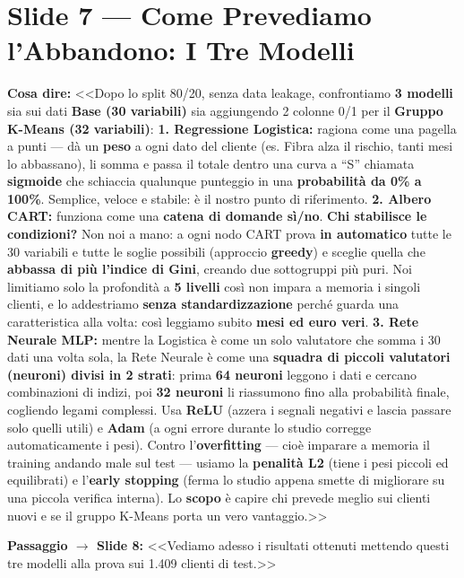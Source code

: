 \documentclass[10pt, a4paper]{article}
\newcommand{\say}[1]{%
  \par\vspace{2pt}\noindent\colorbox{SoftBox}{\parbox{\dimexpr\linewidth-2\fboxsep}{\raggedright\small\textbf{\color{PrimaryNavy}Cosa dire:} #1}}\par\vspace{2pt}%
}
\newcommand{\pass}[2]{%
  \par\vspace{1pt}\noindent\colorbox{PassBox}{\parbox{\dimexpr\linewidth-2\fboxsep}{\raggedright\footnotesize\textbf{\color{AccentAmber}Passaggio $\rightarrow$ Slide #1:} <<#2>>}}\par%
}
\newcommand{\slideblock}[3]{%
  \noindent\begin{minipage}{\linewidth}
    \section*{#1}
    \say{#2}
    #3
  \end{minipage}\par\vspace{6pt}%
}
\begin{document}
\slideblock{Slide 7 --- Come Prevediamo l'Abbandono: I Tre Modelli}{%
<<Dopo lo split 80/20, senza data leakage, confrontiamo \textbf{3 modelli} sia sui dati \textbf{Base (30 variabili)} sia aggiungendo 2 colonne 0/1 per il \textbf{Gruppo K-Means (32 variabili)}:
\textbf{1. Regressione Logistica:} ragiona come una pagella a punti --- dà un \textbf{peso} a ogni dato del cliente (es. Fibra alza il rischio, tanti mesi lo abbassano), li somma e passa il totale dentro una curva a ``S'' chiamata \textbf{sigmoide} che schiaccia qualunque punteggio in una \textbf{probabilità da 0\% a 100\%}. Semplice, veloce e stabile: è il nostro punto di riferimento.
\textbf{2. Albero CART:} funziona come una \textbf{catena di domande sì/no}. \textbf{Chi stabilisce le condizioni?} Non noi a mano: a ogni nodo CART prova \textbf{in automatico} tutte le 30 variabili e tutte le soglie possibili (approccio \textbf{greedy}) e sceglie quella che \textbf{abbassa di più l'indice di Gini}, creando due sottogruppi più puri. Noi limitiamo solo la profondità a \textbf{5 livelli} così non impara a memoria i singoli clienti, e lo addestriamo \textbf{senza standardizzazione} perché guarda una caratteristica alla volta: così leggiamo subito \textbf{mesi ed euro veri}.
\textbf{3. Rete Neurale MLP:} mentre la Logistica è come un solo valutatore che somma i 30 dati una volta sola, la Rete Neurale è come una \textbf{squadra di piccoli valutatori (neuroni) divisi in 2 strati}: prima \textbf{64 neuroni} leggono i dati e cercano combinazioni di indizi, poi \textbf{32 neuroni} li riassumono fino alla probabilità finale, cogliendo legami complessi. Usa \textbf{ReLU} (azzera i segnali negativi e lascia passare solo quelli utili) e \textbf{Adam} (a ogni errore durante lo studio corregge automaticamente i pesi). Contro l'\textbf{overfitting} --- cioè imparare a memoria il training andando male sul test --- usiamo la \textbf{penalità L2} (tiene i pesi piccoli ed equilibrati) e l'\textbf{early stopping} (ferma lo studio appena smette di migliorare su una piccola verifica interna). Lo \textbf{scopo} è capire chi prevede meglio sui clienti nuovi e se il gruppo K-Means porta un vero vantaggio.>>%
}{\pass{8}{Vediamo adesso i risultati ottenuti mettendo questi tre modelli alla prova sui 1.409 clienti di test.}}
\end{document}
